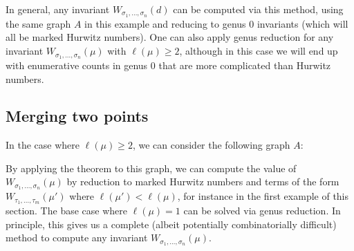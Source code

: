 \documentclass[11pt]{article}           %
\theoremstyle{definition}
\begin{document}
In general, any invariant $W_{\sigma_1,\dots,\sigma_n}(d)$ can be computed via this method, using the
same graph $A$ in this example and reducing to genus $0$ invariants (which will all be marked
Hurwitz numbers). One can also apply genus reduction for any
invariant $W_{\sigma_1,\dots,\sigma_n}(\mu)$ with $\ell(\mu)\geq 2$, although in
this case we will end up with enumerative counts in genus $0$ that
are more complicated than Hurwitz numbers.

  \subsection{Merging two points}

  In the case where $\ell(\mu)\geq 2$, we can consider the following graph $A$:


                By applying the theorem to this graph, we can compute the value of
                $W_{\sigma_1,\dots,\sigma_n}(\mu)$ by reduction to marked Hurwitz
                numbers and terms of the form
                $W_{\tau_1,\dots,\tau_m}(\mu')$ where $\ell(\mu')<\ell(\mu)$, for instance
                in the first example of this section.
                The base case where $\ell(\mu)=1$ can be solved via genus reduction.
                In principle, this gives us a complete (albeit potentially combinatorially difficult) method to compute any invariant $W_{\sigma_1,\dots,\sigma_n}(\mu)$.
\end{document}
